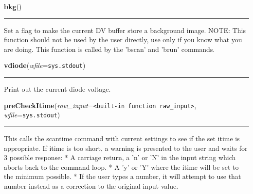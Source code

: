     \label{runrun:bkg}

    \vspace{0.5ex}

    \begin{boxedminipage}{\textwidth}

    \raggedright \textbf{bkg}()

    \vspace{-1.5ex}

    \rule{\textwidth}{0.5\fboxrule}
    Set a flag to make the current DV buffer store a background image. 
    NOTE: This function should not be used by the user directly, use only 
    if you know what you are doing. This function is called by the 'bscan' 
    and 'brun' commands.

    \vspace{1ex}

    \end{boxedminipage}

    \label{runrun:vdiode}

    \vspace{0.5ex}

    \begin{boxedminipage}{\textwidth}

    \raggedright \textbf{vdiode}(\textit{wfile}=\texttt{sys.stdout})

    \vspace{-1.5ex}

    \rule{\textwidth}{0.5\fboxrule}
    Print out the current diode voltage.

    \vspace{1ex}

    \end{boxedminipage}

    \label{runrun:preCheckItime}

    \vspace{0.5ex}

    \begin{boxedminipage}{\textwidth}

    \raggedright \textbf{preCheckItime}(\textit{raw\_input}=\texttt{{\textless}built-in function raw\_input{\textgreater}}, \textit{wfile}=\texttt{sys.stdout})

    \vspace{-1.5ex}

    \rule{\textwidth}{0.5\fboxrule}
    This calls the scantime command with current settings to see if the set
    itime is appropriate. If itime is too short, a warning is presented to 
    the user and waits for 3 possible response: * A carriage return, a 'n' 
    or 'N' in the input string which aborts back to the command loop. * A 
    'y' or 'Y' where the itime will be set to the minimum possible. * If 
    the user types a number, it will attempt to use that number instead as 
    a correction to the original input value.

    \vspace{1ex}

    \end{boxedminipage}

